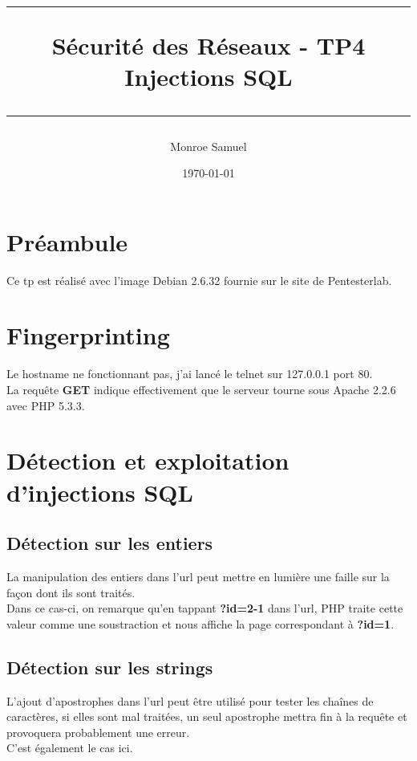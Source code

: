 \documentclass[a4paper,10pt,final,fleqn]{article}
\title{
\parbox{15cm}
{ %
  \vspace{3cm}
	\begin{center}\sf\bfseries\Huge
		\rule{15cm}{1pt}
		\medskip
		Sécurité des Réseaux - TP4 \\
		\huge Injections SQL
		\vspace{.5cm}
		\rule{15cm}{1pt}
	\end{center}
	\vspace{3cm}
 }}
\author{Monroe Samuel}
\date{\today}
\begin{document}
\maketitle
\newpage

	\section{Préambule}

		Ce tp est réalisé avec l'image Debian 2.6.32 fournie sur le site de Pentesterlab.

	\section{Fingerprinting}

		Le hostname ne fonctionnant pas, j'ai lancé le telnet sur 127.0.0.1 port 80.\\

		La requête \textbf{GET} indique effectivement que le serveur tourne sous Apache 2.2.6 avec PHP 5.3.3.\\

	\section{Détection et exploitation d'injections SQL}

		\subsection{Détection sur les entiers}

			La manipulation des entiers dans l'url peut mettre en lumière une faille sur la façon dont ils sont traités.\\
			Dans ce cas-ci, on remarque qu'en tappant \textbf{?id=2-1} dans l'url, PHP traite cette valeur comme une soustraction et nous affiche la page correspondant à \textbf{?id=1}.\\

		\subsection{Détection sur les strings}

			L'ajout d'apostrophes dans l'url peut être utilisé pour tester les chaînes de caractères, si elles sont mal traitées, un seul apostrophe mettra fin à la requête et provoquera probablement une erreur.\\
			C'est également le cas ici.\\
\end{document}
